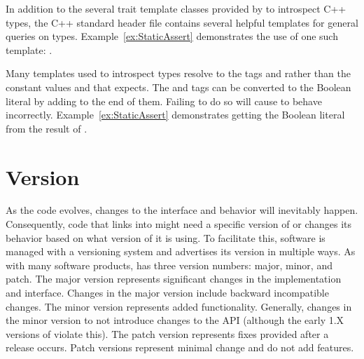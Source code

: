 
\begin{didyouknow}
  In addition to the several trait template classes provided by \VTKm to introspect C++ types, the C++ standard  header file contains several helpful templates for general queries on types.
  Example~\ref{ex:StaticAssert} demonstrates the use of one such template: .
\end{didyouknow}

\begin{commonerrors}
    
  Many templates used to introspect types resolve to the tags  and  rather than the constant values  and  that  expects.
  The  and  tags can be converted to the Boolean literal by adding  to the end of them.
  Failing to do so will cause  to behave incorrectly.
  Example~\ref{ex:StaticAssert} demonstrates getting the Boolean literal from the result of .
\end{commonerrors}





\section{\VTKm Version}
\label{sec:Version}


As the \VTKm code evolves, changes to the interface and behavior will inevitably happen.
Consequently, code that links into \VTKm might need a specific version of \VTKm or changes its behavior based on what version of \VTKm it is using.
To facilitate this, \VTKm software is managed with a versioning system and advertises its version in multiple ways.
As with many software products, \VTKm has three version numbers: major, minor, and patch.
The major version represents significant changes in the \VTKm implementation and interface.
Changes in the major version include backward incompatible changes.
The minor version represents added functionality.
Generally, changes in the minor version to not introduce changes to the API (although the early 1.X versions of \VTKm violate this).
The patch version represents fixes provided after a release occurs.
Patch versions represent minimal change and do not add features.

